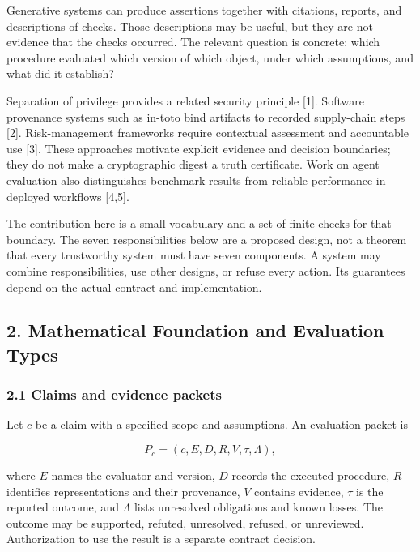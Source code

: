 \documentclass[
  10pt,
]{article}
\begin{document}
Generative systems can produce assertions together with citations, reports, and descriptions of checks. Those descriptions may be useful, but they are not evidence that the checks occurred. The relevant question is concrete: which procedure evaluated which version of which object, under which assumptions, and what did it establish?

Separation of privilege provides a related security principle {[}1{]}. Software provenance systems such as in-toto bind artifacts to recorded supply-chain steps {[}2{]}. Risk-management frameworks require contextual assessment and accountable use {[}3{]}. These approaches motivate explicit evidence and decision boundaries; they do not make a cryptographic digest a truth certificate. Work on agent evaluation also distinguishes benchmark results from reliable performance in deployed workflows {[}4,5{]}.

The contribution here is a small vocabulary and a set of finite checks for that boundary. The seven responsibilities below are a proposed design, not a theorem that every trustworthy system must have seven components. A system may combine responsibilities, use other designs, or refuse every action. Its guarantees depend on the actual contract and implementation.

\subsection{2. Mathematical Foundation and Evaluation Types}\label{mathematical-foundation-and-evaluation-types}

\subsubsection{2.1 Claims and evidence packets}\label{claims-and-evidence-packets}

Let \hypertarget{math-E0001-0001}{}{\(c\)} be a claim with a specified scope and assumptions. An evaluation packet is

\hypertarget{math-E0002-0002}{}{\[P_c=(c,E,D,R,V,\tau,\Lambda),\]}

where \hypertarget{math-E0003-0003}{}{\(E\)} names the evaluator and version, \hypertarget{math-E0004-0004}{}{\(D\)} records the executed procedure, \hypertarget{math-E0005-0005}{}{\(R\)} identifies representations and their provenance, \hypertarget{math-E0006-0006}{}{\(V\)} contains evidence, \hypertarget{math-E0007-0007}{}{\(\tau\)} is the reported outcome, and \hypertarget{math-E0008-0008}{}{\(\Lambda\)} lists unresolved obligations and known losses. The outcome may be supported, refuted, unresolved, refused, or unreviewed. Authorization to use the result is a separate contract decision.
\end{document}
